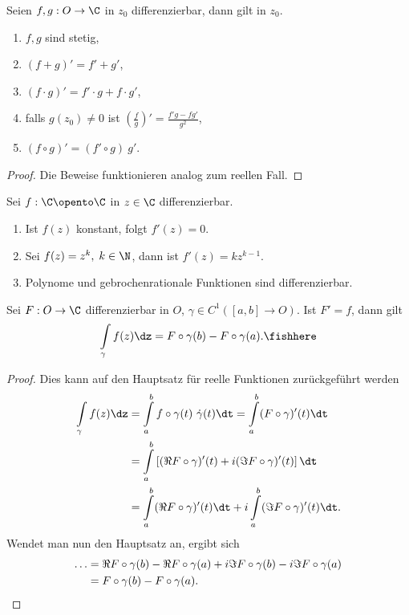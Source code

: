 \begin{prop}
\label{prop:2.20}
Seien $f,g : O \to \C$ in $z_0$ differenzierbar, dann gilt in $z_0$.
\begin{enumerate}
  \item $f,g$ sind stetig,
  \item $(f+g)' = f' + g'$,
  \item $(f\cdot g)' = f'\cdot g + f\cdot g'$,
  \item falls $g(z_0)\neq 0$ ist $\left(\frac{f}{g}\right)' =
  \frac{f'g-fg'}{g^2}$,
  \item $\left(f\circ g \right)' = (f'\circ g)\ g'$.\fishhere
\end{enumerate}
\end{prop}

\begin{proof}
Die Beweise funktionieren analog zum reellen Fall.\qedhere
\end{proof}

\begin{cor}
\label{prop:2.21}
Sei $f : \C\opento \C$  in $z\in\C$ differenzierbar.
\begin{enumerate}
  \item Ist $f(z)$ konstant, folgt $f'(z) = 0$.
  \item Sei $f(z) = z^k,\; k\in\N$, dann ist $f'(z) = kz^{k-1}$.
  \item Polynome und gebrochenrationale Funktionen sind
  differenzierbar.\fishhere
\end{enumerate}
\end{cor}

\begin{prop}
\label{prop:2.22}
Sei $F : O \to \C$ differenzierbar in $O$, $\gamma\in C^1([a,b]\to O)$. Ist
$F' = f$, dann gilt
\begin{align*}
\int\limits_\gamma f(z) \dz = F\circ \gamma(b) - F\circ\gamma(a).\fishhere
\end{align*}
\end{prop}
\begin{proof}
Dies kann auf den Hauptsatz für reelle Funktionen zurückgeführt werden
\begin{align*}
\int \limits_\gamma f(z) \dz &= \int\limits_a^b
f\circ\gamma(t)\ \dot{\gamma}(t)\dt = \int\limits_a^b (F\circ \gamma)'(t) \dt
\\
&= \int\limits_a^b \left[ (\Re F\circ \gamma)'(t) + i(\Im F\circ
\gamma)'(t)\right] \dt  \\ &= \int\limits_a^b (\Re F\circ \gamma)'(t) \dt + i
\int\limits_a^b (\Im F\circ \gamma)'(t) \dt.
\end{align*}
Wendet man nun den Hauptsatz an, ergibt sich
\begin{align*}
\ldots &= \Re F\circ \gamma(b) - \Re F\circ \gamma(a) + i  \Im F\circ \gamma(b)
- i\Im F\circ \gamma(a) \\
&= F\circ\gamma(b) - F\circ\gamma(a).\qedhere
\end{align*}
\end{proof}

